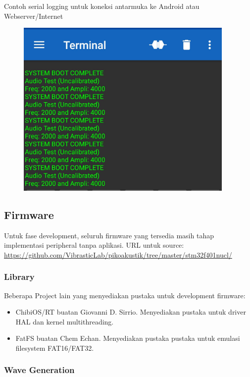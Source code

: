 \documentclass[12pt,]{article}
\begin{document}
	\newpage
	Contoh serial logging untuk koneksi antarmuka ke Android atau Webserver/Internet
	\begin{figure}[!ht]
		\centering
		\includegraphics[width=300pt]{images/seriallog}
	\end{figure}
	
	\newpage
	\mbox{}
	
	\newpage
	\subsection{Firmware}
	
	Untuk fase development, seluruh firmware yang tersedia masih tahap implementasi peripheral tanpa aplikasi.
	URL untuk source: \url{https://github.com/VibrasticLab/pikoakustik/tree/master/stm32f401nucl/}
	
	\subsubsection{Library}
	
	Beberapa Project lain yang menyediakan pustaka untuk development firmware:
	\begin{itemize}
		\item ChibiOS/RT buatan Giovanni D. Sirrio. Menyediakan pustaka untuk driver HAL dan kernel multithreading.
		\item FatFS buatan Chem Echan. Menyediakan pustaka pustaka untuk emulasi filesystem FAT16/FAT32.
	\end{itemize}

	\subsubsection{Wave Generation}
	 
\end{document}
